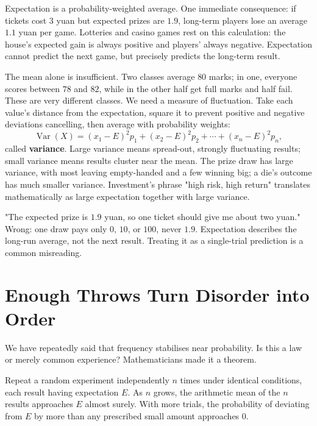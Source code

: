 Expectation is a probability-weighted average. One immediate consequence: if tickets cost $3$ yuan but expected prizes are $1.9$, long-term players lose an average $1.1$ yuan per game. Lotteries and casino games rest on this calculation: the house's expected gain is always positive and players' always negative. Expectation cannot predict the next game, but precisely predicts the long-term result.

The mean alone is insufficient. Two classes average $80$ marks; in one, everyone scores between $78$ and $82$, while in the other half get full marks and half fail. These are very different classes. We need a measure of fluctuation. Take each value's distance from the expectation, square it to prevent positive and negative deviations cancelling, then average with probability weights:
\[
\operatorname{Var}(X)=(x_1-E)^2p_1+(x_2-E)^2p_2+\cdots+(x_n-E)^2p_n,
\]
called \textbf{variance}. Large variance means spread-out, strongly fluctuating results; small variance means results cluster near the mean. The prize draw has large variance, with most leaving empty-handed and a few winning big; a die's outcome has much smaller variance. Investment's phrase "high risk, high return" translates mathematically as large expectation together with large variance.

\begin{fanli}
"The expected prize is $1.9$ yuan, so one ticket should give me about two yuan." Wrong: one draw pays only $0$, $10$, or $100$, never $1.9$. Expectation describes the long-run average, not the next result. Treating it as a single-trial prediction is a common misreading.
\end{fanli}

\section{Enough Throws Turn Disorder into Order}

We have repeatedly said that frequency stabilises near probability. Is this a law or merely common experience? Mathematicians made it a theorem.

\begin{dingli}
Repeat a random experiment independently $n$ times under identical conditions, each result having expectation $E$. As $n$ grows, the arithmetic mean of the $n$ results approaches $E$ almost surely. With more trials, the probability of deviating from $E$ by more than any prescribed small amount approaches $0$.
\end{dingli}

